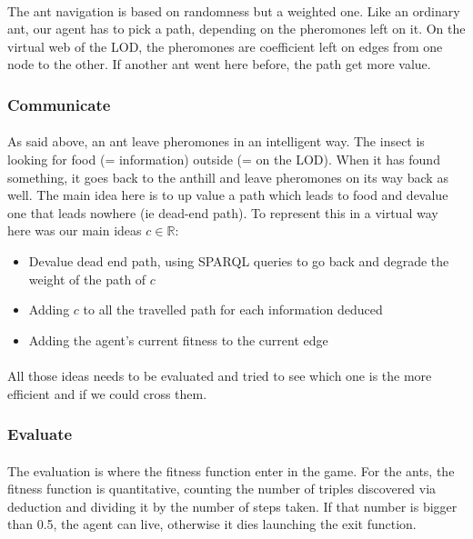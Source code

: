 \documentclass{article}
\newenvironment{itemh}[0]{\begin{itemize}[label=$\heartsuit$, font=\color{mygray} \small]}{\end{itemize}}
\begin{document}
			\paragraph{}
			The ant navigation is based on randomness but a weighted one.
			Like an ordinary ant, our agent has to pick a path, depending on the pheromones left on it.
			On the virtual web of the LOD, the pheromones are coefficient left on edges from one node to the other.
			If another ant went here before, the path get more value.			
		\subsubsection{Communicate}
			\paragraph{}
			As said above, an ant leave pheromones in an intelligent way.
			The insect is looking for food (= information) outside (= on the LOD).
			When it has found something, it goes back to the anthill and leave pheromones on its way back as well.
			The main idea here is to up value a path which leads to food and devalue one that leads nowhere (ie dead-end path).
			To represent this in a virtual way here was our main ideas $c \in \mathbb{R}$:
			\begin{itemh}
				\item Devalue dead end path, using SPARQL queries to go back and degrade the weight of the path of $c$
				\item Adding $c$ to all the travelled path for each information deduced
				\item Adding the agent's current fitness to the current edge
			\end{itemh}
			\paragraph{}
				All those ideas needs to be evaluated and tried to see which one is the more efficient and if we could cross them.
		\subsubsection{Evaluate}
			\paragraph{}
			The evaluation is where the fitness function enter in the game.
			For the ants, the fitness function is quantitative,
			counting the number of triples discovered via deduction and dividing it by the number of steps taken.
			If that number is bigger than 0.5, the agent can live, otherwise it dies launching the exit function.
\end{document}
